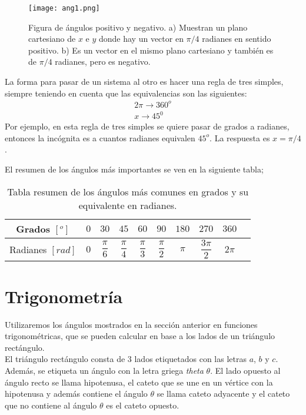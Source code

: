  \begin{center}
\begin{figure}[h!]
\centering
\texttt{[image: ang1.png]}
\caption[Figura de radianes positivo y negativo]{Figura de ángulos positivo y negativo. a) Muestran un plano cartesiano de $x$ e $y$ donde hay un vector en $\pi/4$ radianes en sentido positivo. b) Es un vector en el mismo plano cartesiano y también es de $\pi/4$ radianes, pero es negativo.} \label{grados0}
\end{figure}
\end{center}

La forma para pasar de un sistema al otro es hacer una regla de tres simples, siempre teniendo en cuenta que las equivalencias son las siguientes:
\begin{eqnarray*}
2\pi\rightarrow 360^{o}\\
x\rightarrow 45^{0}
\end{eqnarray*}
Por ejemplo, en esta regla de tres simples se quiere pasar de grados a radianes, entonces la incógnita es a cuantos radianes equivalen $45^{o}$. La respuesta es $x=\pi/4$.

El resumen de los ángulos más importantes se ven en la siguiente tabla;


\begin{table}[h!]
\begin{center}
 \begin{tabular}{|c|c|c|c|c|c|c|c|c|c|}
 \hline
 Grados $[^{o}]$ &$0$&$30$&$45$&$60$&$90$&$180$&$270$&$360$ \\
 \hline
 Radianes $[rad]$ &$0$&$\dfrac{\pi}{6}$&$\dfrac{\pi}{4}$&$\dfrac{\pi}{3}$&$\dfrac{\pi}{2}$&$\pi$&$\dfrac{3\pi}{2}$&$2\pi$ \\
 \hline
 \end{tabular}
 \caption{Tabla resumen de los ángulos más comunes en grados y su equivalente en radianes.}
 \end{center}
\end{table}
\newpage
\section{Trigonometría}

Utilizaremos los ángulos mostrados en la sección anterior en funciones trigonométricas, que se pueden calcular en base a los lados de un triángulo rectángulo.\\
El triángulo rectángulo consta de 3 lados etiquetados con las letras $a$, $b$ y $c$. Además, se etiqueta un ángulo con la letra griega \textit{theta} $\theta$. El lado opuesto al ángulo recto se llama hipotenusa, el cateto que se une en un vértice con la hipotenusa y además contiene el ángulo $\theta$ se llama cateto adyacente y el cateto que no contiene al ángulo $\theta$ es el cateto opuesto.

